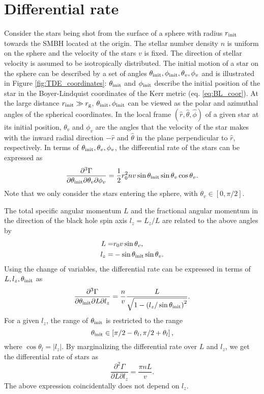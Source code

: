 \documentclass[useAMS,usenatbib]{mn2e}
\def\rg{r_{\rm g}}
\def\rinit{r_{\rm init}}
\def\thetainit{\theta_{\rm init}}
\def\phiinit{\phi_{\rm init}}
\newcommand{\lrb}[1]{\left({#1}\right)}
\newcommand{\lrsb}[1]{\left[{#1}\right]}
\newcommand{\abs}[1]{\left|#1\right|}
\begin{document}
\section{Differential rate}\label{sec:differential_rate}
Consider the stars being shot from the surface of a sphere with radius $\rinit$ towards the SMBH located at the origin.
The stellar number density $n$ is uniform on the sphere and the velocity of the stars $v$ is fixed.
The direction of stellar velocity is assumed to be isotropically distributed.
The initial motion of a star on the sphere can be described by a set of angles $\thetainit,\phiinit,\theta_v,\phi_v$ and is illustrated in Figure \ref{fig:TDE_coordinates}:
$\thetainit$ and $\phiinit$ describe the initial position of the star in the Boyer-Lindquist coordinates of the Kerr metric (eq. \ref{eq:BL_coor}).
At the large distance $\rinit\gg\rg$, $\thetainit,\phiinit$ can be viewed as the polar and azimuthal angles of the spherical coordinates.
In the local frame $(\hat{r},\hat{\theta},\hat{\phi})$ of a given star at its initial position, $\theta_v$ and $\phi_v$ are the angles that the velocity of the star makes with the inward radial direction $-\hat{r}$ and $\hat{\theta}$ in the plane perpendicular to $\hat{r}$, respectively.
In terms of $\thetainit,\theta_v,\phi_v$, the differential rate of the stars can be expressed as
\begin{equation}
    \frac{\partial^3\Gamma}{\partial\thetainit\partial\theta_v\partial\phi_v}=\frac{1}{2}r_0^2nv\sin\thetainit\sin\theta_v\cos\theta_v.
\end{equation}
Note that we only consider the stars entering the sphere, with $\theta_v\in[0,\pi/2]$.

The total specific angular momentum $L$ and the fractional angular momentum in the direction of the black hole spin axis $l_z=L_z/L$ are related to the above angles by
\begin{align}
    L =   & r_0v\sin\theta_v,\\
    l_z = & -\sin\thetainit\sin\theta_v.
\end{align}
Using the change of variables, the differential rate can be expressed in terms of $L,l_z,\thetainit$ as
\begin{equation}
    \frac{\partial^3\Gamma}{\partial\thetainit\partial L\partial l_z}=\frac{n}{v}\frac{L}{\sqrt{1-\lrb{l_z/\sin\thetainit}^2}}.
\end{equation}
For a given $l_z$, the range of $\thetainit$ is restricted to the range
\begin{equation}
    \thetainit\in\lrsb{\pi/2-\theta_l,\pi/2+\theta_l},
\end{equation}
where $\cos\theta_l=\abs{l_z}$.
By marginalizing the differential rate over $L$ and $l_z$, we get the differential rate of stars as
\begin{equation}
    \frac{\partial^2\Gamma}{\partial L\partial l_z}=\frac{\pi nL}{v}.
\end{equation}
The above expression coincidentally does not depend on $l_z$.
\end{document}

